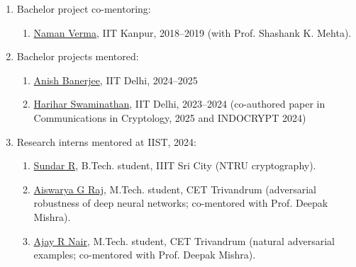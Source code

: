 \documentclass[margin]{res} %
\begin{document}
\begin{resume}
\begin{enumerate}
\begin{enumerate}
            \item \href{https://mahe94.github.io/assets/pdf/abhinav.pdf}{Abhinav Kumar}, IIT Delhi, 2023--2024 (co-authored paper in Communications in Cryptology, 2025)

            \item \href{https://mahe94.github.io/assets/pdf/dhairya.pdf}{Dhairya Gupta}, IIT Delhi, 2023--2024 (co-authored paper at INDOCRYPT 2024) 
        \end{enumerate}

    \item Bachelor project co-mentoring:
        \begin{enumerate}
            \item \href{https://mahe94.github.io/assets/pdf/naman.pdf}{Naman Verma}, IIT Kanpur, 2018--2019 (with Prof. Shashank K. Mehta).
        \end{enumerate}
    
    \item Bachelor projects mentored: 
        \begin{enumerate}
            \item \href{https://ab271202.github.io/notes}{Anish Banerjee}, IIT Delhi, 2024--2025


            \item \href{https://scholar.google.com/citations?user=WKfskVwAAAAJ&hl=en}{Harihar Swaminathan}, IIT Delhi, 2023--2024 (co-authored paper in Communications in Cryptology, 2025 and INDOCRYPT 2024) 
        \end{enumerate}
    \item Research interns mentored at IIST, 2024:
        \begin{enumerate}
            \item \href{https://mahe94.github.io/assets/pdf/sundar.pdf}{Sundar R}, B.Tech. student, IIIT Sri City (NTRU cryptography).
            \item \href{https://mahe94.github.io/assets/pdf/aiswarya.pdf}{Aiswarya G Raj}, M.Tech. student, CET Trivandrum (adversarial robustness of deep neural networks; co-mentored with Prof. Deepak Mishra).
            \item \href{https://mahe94.github.io/assets/pdf/ajay.pdf}{Ajay R Nair}, M.Tech. student, CET Trivandrum (natural adversarial examples; co-mentored with Prof. Deepak Mishra).
        \end{enumerate}

\end{enumerate}


\end{resume}
\end{document}
